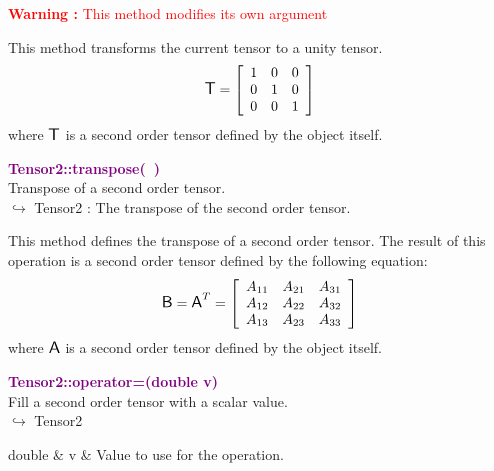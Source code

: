 \hspace*{10mm}\textcolor{red}{\textbf{Warning :} This method modifies its own argument}

This method transforms the current tensor to a unity tensor.
\begin{equation*}
\mbox{\large\ensuremath{\mathsf{T}}}=\left[\begin{array}{ccc}
1&0&0\\
0&1&0\\
0&0&1
\end{array}\right]
\end{equation*}
where $\mbox{\large\ensuremath{\mathsf{T}}}$ is a second order tensor defined by the object itself.

\textcolor{purple}{\textbf{Tensor2::transpose(~)}}\label{Tensor2::transpose()}\\
Transpose of a second order tensor.\\ \hspace*{10mm}$\hookrightarrow$ Tensor2 : The transpose of the second order tensor.

This method defines the transpose of a second order tensor.
The result of this operation is a second order tensor defined by the following equation:
\begin{equation*}
\mbox{\large\ensuremath{\mathsf{B}}}=\mbox{\large\ensuremath{\mathsf{A}}}^T =\left[\begin{array}{ccc}
  A_{11} & A_{21} & A_{31}\\
  A_{12} & A_{22} & A_{32}\\
  A_{13} & A_{23} & A_{33}
  \end{array}\right]
\end{equation*}
where $\mbox{\large\ensuremath{\mathsf{A}}}$ is a second order tensor defined by the object itself.

\textcolor{purple}{\textbf{Tensor2::operator=(double v)}}\label{Tensor2::operator=(double v)}\\
Fill a second order tensor with a scalar value.\\ \hspace*{10mm}$\hookrightarrow$ Tensor2

\begin{tcolorbox}[width=\textwidth,myArgs,tabularx={ll|R}]
double & v & Value to use for the operation.
\end{tcolorbox}

